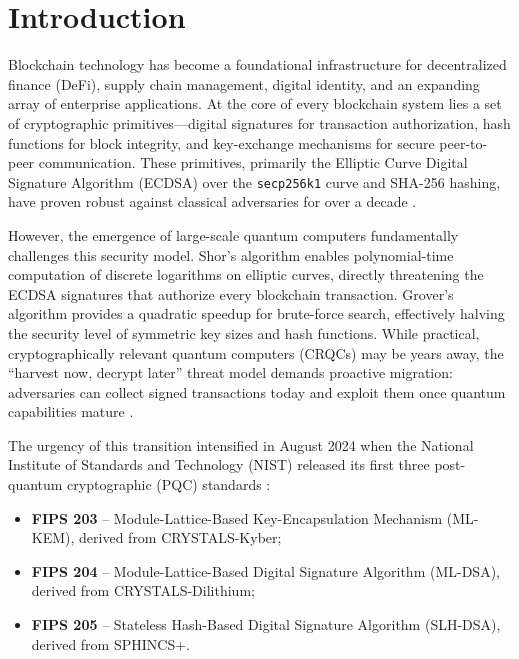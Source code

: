 \documentclass[12pt, a4paper, twocolumn]{article}
\begin{document}
\section{Introduction}
\label{sec:introduction}

Blockchain technology has become a foundational infrastructure for decentralized finance (DeFi), supply chain management, digital identity, and an expanding array of enterprise applications. At the core of every blockchain system lies a set of cryptographic primitives---digital signatures for transaction authorization, hash functions for block integrity, and key-exchange mechanisms for secure peer-to-peer communication. These primitives, primarily the Elliptic Curve Digital Signature Algorithm (ECDSA) over the \texttt{secp256k1} curve and SHA-256 hashing, have proven robust against classical adversaries for over a decade \cite{nakamoto2008bitcoin, buterin2014ethereum}.

However, the emergence of large-scale quantum computers fundamentally challenges this security model. Shor's algorithm \cite{shor1997polynomial} enables polynomial-time computation of discrete logarithms on elliptic curves, directly threatening the ECDSA signatures that authorize every blockchain transaction. Grover's algorithm \cite{grover1996fast} provides a quadratic speedup for brute-force search, effectively halving the security level of symmetric key sizes and hash functions. While practical, cryptographically relevant quantum computers (CRQCs) may be years away, the ``harvest now, decrypt later'' threat model demands proactive migration: adversaries can collect signed transactions today and exploit them once quantum capabilities mature \cite{mosca2018cybersecurity}.

The urgency of this transition intensified in August 2024 when the National Institute of Standards and Technology (NIST) released its first three post-quantum cryptographic (PQC) standards \cite{nist2024pqc}:

\begin{itemize}[noitemsep]
  \item \textbf{FIPS 203} -- Module-Lattice-Based Key-Encapsulation Mechanism (ML-KEM), derived from CRYSTALS-Kyber;
  \item \textbf{FIPS 204} -- Module-Lattice-Based Digital Signature Algorithm (ML-DSA), derived from CRYSTALS-Dilithium;
  \item \textbf{FIPS 205} -- Stateless Hash-Based Digital Signature Algorithm (SLH-DSA), derived from SPHINCS+.
\end{itemize}
\end{document}
